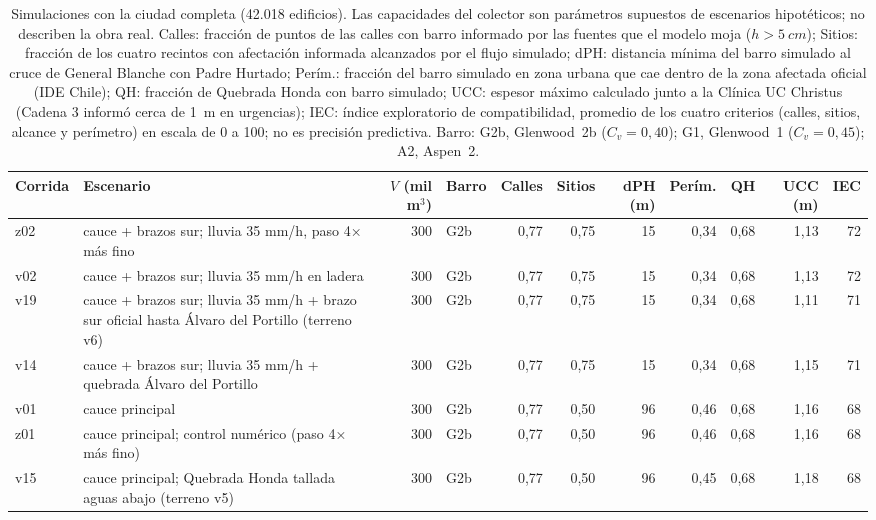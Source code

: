 \begin{table}[htbp]\centering\small
\caption{Simulaciones con la ciudad completa (42.018 edificios). Las capacidades del colector son parámetros supuestos de escenarios hipotéticos; no describen la obra real. Calles: fracción de puntos de las calles con barro informado por las fuentes que el modelo moja ($h>\SI{5}{cm}$); Sitios: fracción de los cuatro recintos con afectación informada alcanzados por el flujo simulado; dPH: distancia mínima del barro simulado al cruce de General Blanche con Padre Hurtado; Perím.: fracción del barro simulado en zona urbana que cae dentro de la zona afectada oficial (IDE Chile); QH: fracción de Quebrada Honda con barro simulado; UCC: espesor máximo calculado junto a la Clínica UC Christus (Cadena 3 informó cerca de \SI{1}{m} en urgencias); IEC: índice exploratorio de compatibilidad, promedio de los cuatro criterios (calles, sitios, alcance y perímetro) en escala de 0 a 100; no es precisión predictiva. Barro: G2b, Glenwood~2b ($C_v=0{,}40$); G1, Glenwood~1 ($C_v=0{,}45$); A2, Aspen~2.}\label{tab:v4}
{\setlength{\tabcolsep}{3.5pt}\begin{adjustbox}{max width=\textwidth}\begin{tabular}{llrlrrrrrrr}\toprule
Corrida & Escenario & $V$ (mil m$^3$) & Barro & Calles & Sitios & dPH (m) & Perím. & QH & UCC (m) & IEC\\
\midrule
z02 & cauce + brazos sur; lluvia 35 mm/h, paso 4× más fino & 300 & G2b & 0{,}77 & 0{,}75 & 15 & 0{,}34 & 0{,}68 & 1{,}13 & 72\\
v02 & cauce + brazos sur; lluvia 35 mm/h en ladera & 300 & G2b & 0{,}77 & 0{,}75 & 15 & 0{,}34 & 0{,}68 & 1{,}13 & 72\\
v19 & cauce + brazos sur; lluvia 35 mm/h + brazo sur oficial hasta Álvaro del Portillo (terreno v6) & 300 & G2b & 0{,}77 & 0{,}75 & 15 & 0{,}34 & 0{,}68 & 1{,}11 & 71\\
v14 & cauce + brazos sur; lluvia 35 mm/h + quebrada Álvaro del Portillo & 300 & G2b & 0{,}77 & 0{,}75 & 15 & 0{,}34 & 0{,}68 & 1{,}15 & 71\\
v01 & cauce principal & 300 & G2b & 0{,}77 & 0{,}50 & 96 & 0{,}46 & 0{,}68 & 1{,}16 & 68\\
z01 & cauce principal; control numérico (paso 4× más fino) & 300 & G2b & 0{,}77 & 0{,}50 & 96 & 0{,}46 & 0{,}68 & 1{,}16 & 68\\
v15 & cauce principal; Quebrada Honda tallada aguas abajo (terreno v5) & 300 & G2b & 0{,}77 & 0{,}50 & 96 & 0{,}45 & 0{,}68 & 1{,}18 & 68\\

\end{tabular}
\end{adjustbox}}
\end{table}
